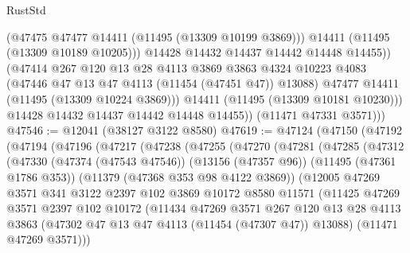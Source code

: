 \begin{lexlean}{RustStd}
\begin{coremodule}
                    (@47475 @47477 @14411 (@11495 (@13309 @10199 @3869)))
                    @14411
                    (@11495 (@13309 @10189 @10205)))
                  @14428
                  @14432
                  @14437
                  @14442
                  @14448
                  @14455))
              (@47414
                @267
                @120
                @13
                @28
                @4113
                @3869
                @3863
                @4324
                @10223
                @4083
                (@47446 @47 @13 @47 @4113 (@11454 (@47451 @47)) @13088)
                @47477
                @14411
                (@11495 (@13309 @10224 @3869)))
              @14411
              (@11495 (@13309 @10181 @10230)))
            @14428
            @14432
            @14437
            @14442
            @14448
            @14455))
        (@11471 @47331 @3571)))
@47546 := @12041 (@38127 @3122 @8580)
@47619 := @47124
    (@47150
      (@47192
        (@47194
          (@47196
            (@47217
              (@47238
                (@47255
                  (@47270
                    (@47281
                      (@47285
                        (@47312
                          (@47330
                            (@47374 (@47543 @47546))
                            (@13156 (@47357 @96))
                            (@11495 (@47361 @1786 @353))
                            (@11379 (@47368 @353 @98 @4122 @3869))
                            (@12005
                              @47269
                              @3571
                              @341
                              @3122
                              @2397
                              @102
                              @3869
                              @10172
                              @8580
                              @11571
                              (@11425
                                @47269
                                @3571
                                @2397
                                @102
                                @10172
                                (@11434
                                  @47269
                                  @3571
                                  @267
                                  @120
                                  @13
                                  @28
                                  @4113
                                  @3863
                                  (@47302 @47 @13 @47 @4113 (@11454 (@47307 @47)) @13088)
                                  (@11471 @47269 @3571)))

\end{coremodule}
\end{lexlean}
